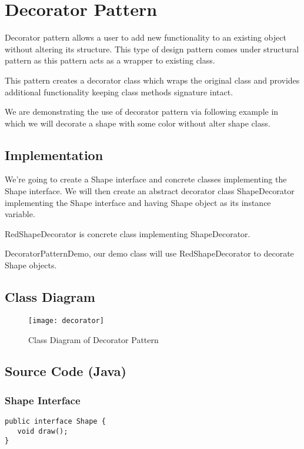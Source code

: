 \newpage
\section{Decorator Pattern}

Decorator pattern allows a user to add new functionality to an existing object without altering its structure. This type of design pattern comes under structural pattern as this pattern acts as a wrapper to existing class.

This pattern creates a decorator class which wraps the original class and provides additional functionality keeping class methods signature intact.

We are demonstrating the use of decorator pattern via following example in which we will decorate a shape with some color without alter shape class.

\subsection{Implementation}

We're going to create a Shape interface and concrete classes implementing the Shape interface. We will then create an abstract decorator class ShapeDecorator implementing the Shape interface and having Shape object as its instance variable.

RedShapeDecorator is concrete class implementing ShapeDecorator.

DecoratorPatternDemo, our demo class will use RedShapeDecorator to decorate Shape objects.

\subsection{Class Diagram}

\begin{figure}[h]
\centering
\texttt{[image: decorator]}
\caption{Class Diagram of Decorator Pattern}
\end{figure}

\newpage
\subsection{Source Code (Java)}

\subsubsection{Shape Interface}

\begin{verbatim}
public interface Shape {
   void draw();
}
\end{verbatim}

